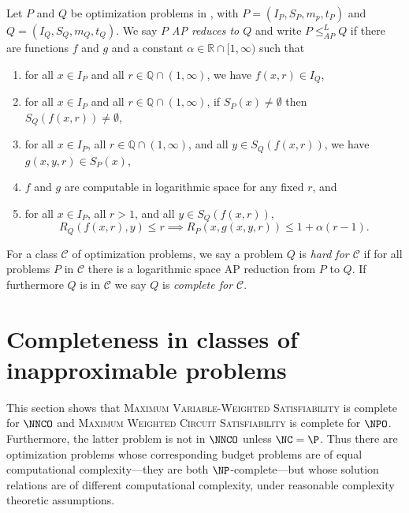 \begin{definition}{{\cite[Definition~8.3]{acgkmp99}}}
  Let $P$ and $Q$ be optimization problems in \NNCO, with $P = (I_P, S_P, m_p, t_P)$ and $Q = (I_Q, S_Q, m_Q, t_Q)$.
  We say \emph{$P$ AP reduces to $Q$} and write $P \leq_{AP}^{L} Q$ if there are functions $f$ and $g$ and a constant $\alpha \in \mathbb{R} \cap [1, \infty)$ such that
  \begin{enumerate}
  \item for all $x \in I_P$ and all $r \in \mathbb{Q} \cap (1, \infty)$, we have $f(x, r) \in I_Q$,
  \item for all $x \in I_P$ and all $r \in \mathbb{Q} \cap (1, \infty)$, if $S_P(x) \neq \emptyset$ then $S_Q(f(x, r)) \neq \emptyset$,
  \item for all $x \in I_P$, all $r \in \mathbb{Q} \cap (1, \infty)$, and all $y \in S_Q(f(x, r))$, we have $g(x, y, r) \in S_P(x)$,
  \item $f$ and $g$ are computable in logarithmic space for any fixed $r$, and
  \item for all $x \in I_P$, all $r > 1$, and all $y\in S_Q(f(x, r))$,
    \begin{equation*}
      R_Q(f(x, r), y) \leq r \implies R_P(x, g(x, y, r)) \leq 1 + \alpha(r - 1).
    \end{equation*}
  \end{enumerate}
\end{definition}


For a class $\mathcal{C}$ of optimization problems, we say a problem $Q$ is \emph{hard for $\mathcal{C}$} if for all problems $P$ in $\mathcal{C}$ there is a logarithmic space AP reduction from $P$ to $Q$.
If furthermore $Q$ is in $\mathcal{C}$ we say $Q$ is \emph{complete for $\mathcal{C}$}.

\section{Completeness in classes of inapproximable problems}

This section shows that \textsc{Maximum Variable-Weighted Satisfiability} is complete for $\NNCO$ and \textsc{Maximum Weighted Circuit Satisfiability} is complete for $\NPO$.
Furthermore, the latter problem is not in $\NNCO$ unless $\NC = \P$.
Thus there are optimization problems whose corresponding budget problems are of equal computational complexity---they are both $\NP$-complete---but whose solution relations are of different computational complexity, under reasonable complexity theoretic assumptions.

